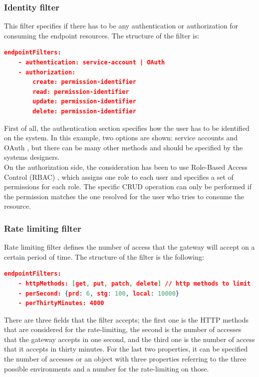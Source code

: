 \documentclass[english, 12pt, a4paper, sci, utf8, a-1b, online]{aaltothesis}
\begin{document}
\subsubsection*{Identity filter}

This filter specifies if there has to be any authentication or authorization for consuming the endpoint resources. The structure of the filter is:\\

\begin{lstlisting}[language=json,firstnumber=1]
  endpointFilters:
    - authentication: service-account | OAuth
    - authorization:
	    create: permission-identifier
	    read: permission-identifier
	    update: permission-identifier
	    delete: permission-identifier
\end{lstlisting}

First of all, the authentication section specifies how the user has to be identified on the system. In this example, two options are shown: service accounts and OAuth \cite{OAuth2}, but there can be many other methods and should be specified by the systems designers.\\

On the authorization side, the consideration has been to use Role-Based Access Control (RBAC) \cite{ferraiolo2003role}, which assigns one role to each user and specifies a set of permissions for each role. The specific CRUD operation can only be performed if the permission matches the one resolved for the user who tries to consume the resource.

\subsubsection*{Rate limiting filter}

Rate limiting filter defines the number of access that the gateway will accept on a certain period of time. The structure of the filter is the following: \\

\begin{lstlisting}[language=json,firstnumber=1]
  endpointFilters:
    - httpMethods: [get, put, patch, delete] // http methods to limit
    - perSecond: {prd: 6, stg: 100, local: 10000}
    - perThirtyMinutes: 4000
\end{lstlisting}

There are three fields that the filter accepts; the first one is the HTTP methods that are considered for the rate-limiting, the second is the number of accesses that the gateway accepts in one second, and the third one is the number of access that it accepts in thirty minutes. For the last two properties, it can be specified the number of accesses or an object with three properties referring to the three possible environments and a number for the rate-limiting on those.
\end{document}
